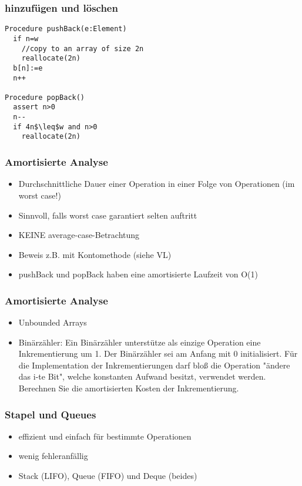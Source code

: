 \begin{frame}[fragile]
\frametitle{hinzufügen und löschen}
\begin{lstlisting}
Procedure pushBack(e:Element)
  if n=w
    //copy to an array of size 2n
    reallocate(2n)
  b[n]:=e
  n++
  
Procedure popBack()
  assert n>0
  n--
  if 4n$\leq$w and n>0
    reallocate(2n)
\end{lstlisting}
\end{frame}

\begin{frame}
\frametitle{Amortisierte Analyse}
\begin{itemize}
\item Durchschnittliche Dauer einer Operation in einer Folge von Operationen (im worst case!)\pause
\item Sinnvoll, falls worst case garantiert selten auftritt\pause
\item KEINE average-case-Betrachtung\pause
\item Beweis z.B. mit Kontomethode (siehe VL)\pause
\item pushBack und popBack haben eine amortisierte Laufzeit von O(1)
\end{itemize}
\end{frame}

\begin{frame}
\frametitle{Amortisierte Analyse}
\begin{itemize}
\item Unbounded Arrays\pause
\item Binärzähler: Ein Binärzähler unterstütze als einzige Operation eine Inkrementierung um 1. Der Binärzähler sei am Anfang mit 0 initialisiert. Für die Implementation der Inkrementierungen darf bloß die Operation "ändere das i-te Bit", welche konstanten Aufwand besitzt, verwendet werden. Berechnen Sie die amortisierten Kosten der Inkrementierung.\\
\end{itemize}
\end{frame}

\begin{frame}
\frametitle{Stapel und Queues}
\begin{itemize}
\item effizient und einfach für bestimmte Operationen
\item wenig fehleranfällig\pause
\item Stack (LIFO), Queue (FIFO) und Deque (beides)
\end{itemize}
\end{frame}


